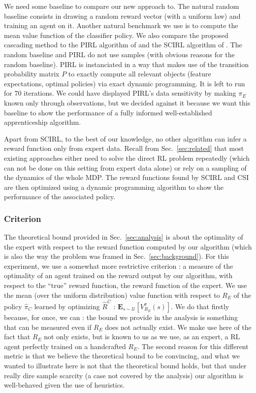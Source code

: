 \documentclass[smallextended]{svjour3}
\begin{document}
We need some baseline to compare our new approach to. The natural random baseline consists in drawing a random reward vector (with a uniform law) and training an agent on it. Another natural benchmark we use is to compute the mean value function of the classifier policy. We also compare the proposed cascading method to the PIRL algorithm of \cite{abbeel2004apprenticeship} and the SCIRL algorithm of \cite{klein2012scirl}. The random baseline and PIRL do not use samples (with obvious reasons for the random baseline). PIRL is instanciated in a way that makes use of the transition probability matrix $P$ to exactly compute all relevant objects (feature expectations, optimal policies) via exact dynamic programming. It is left to run for 70 iterations. We could have displayed PIRL's data sensitivity by making $\pi_E$ known only through observations, but we decided against it because we want this baseline to show the performance of a fully informed well-established apprenticeship algorithm.

Apart from SCIRL, to the best of our knowledge, no other algorithm can infer a reward function only from expert data. Recall from Sec.~\ref{sec:related} that most existing approaches either need to solve the direct RL problem repeatedly (which can not be done on this setting from expert data alone) or rely on a sampling of the dynamics of the whole MDP. The reward functions found by SCIRL and CSI are then optimized using a dynamic programming algorithm to show the performance of the associated policy.

\subsubsection{Criterion}
\label{subsubsec:hcriterion}
The theoretical bound provided in Sec.~\ref{sec:analysis} is about the optimality of the expert with respect to the reward function computed by our algorithm (which is also the way the problem was framed in Sec.~\ref{sec:background}). For this experiment, we use a somewhat more restrictive criterion : a measure of the optimality of an agent trained on the reward output by our algorithm, with respect to the ``true'' reward function, the reward function of the expert. We use the mean (over the uniform distribution) value function with respect to $R_E$ of the policy $\hat \pi_C$ learned by optimizing $\hat R^C$ : $\mathbf{E}_{s\sim\mathcal{U}}[V^{\pi}_{R_E}(s)]$. We do that firstly because, for once, we can : the bound we provide in the analysis is something that can be measured even if $R_E$ does not actually exist. We make use here of the fact that $R_E$ not only exists, but is known to us as we use, as an expert, a RL agent perfectly trained on a handcrafted $R_E$. The second reason for this different metric is that we believe the theoretical bound to be convincing, and what we wanted to illustrate here is not that the theoretical bound holds, but that under really dire sample scarcity (a case not covered by the analysis) our algorithm is well-behaved given the use of heuristics.
\
\end{document}
